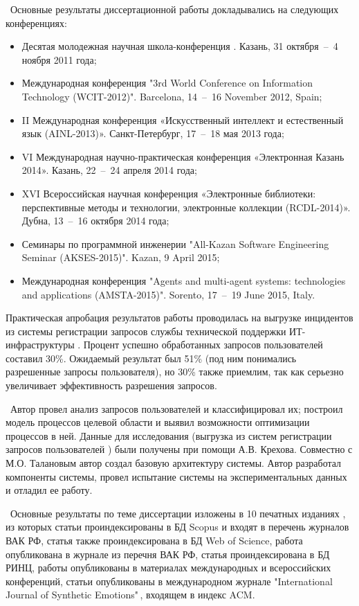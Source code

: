 \probation\
 Основные результаты диссертационной работы докладывались на следующих конференциях:
\begin{itemize}
	\item Десятая молодежная научная школа-конференция . Казань, 31 октября~--~4 ноября 2011 года;
	\item Международная конференция "3rd World Conference on Information Technology (WCIT-2012)". Barcelona, 14~--~16 November 2012, Spain; 
	\item II Международная конференция «Искусственный интеллект и естественный язык (AINL-2013)». Санкт-Петербург, 17~--~18 мая 2013 года;
	\item VI Международная научно-практическая конференция «Электронная Казань 2014». Казань, 22~--~24 апреля 2014 года;
	\item XVI Всероссийская научная конференция «Электронные библиотеки: перспективные методы и технологии, электронные коллекции (RCDL-2014)». Дубна, 13~--~16 октября 2014 года; 
	\item Семинары по программной инженерии "All-Kazan Software Engineering Seminar (AKSES-2015)". Kazan, 9 April 2015;
	\item Международная конференция "Agents and multi-agent systems: technologies and applications (AMSTA-2015)". Sorento, 17~--~19 June 2015, Italy.
\end{itemize} \par
Практическая апробация результатов работы проводилась на выгрузке инцидентов из системы регистрации запросов службы технической поддержки ИТ-инфраструктуры \icl. Процент успешно обработанных запросов пользователей составил 30\%. Ожидаемый результат был 51\% (под ним понимались разрешенные запросы пользователя), но 30\% также приемлим, так как серьезно увеличивает эффективность разрешения запросов. \par
\contribution\ Автор провел анализ запросов пользователей и классифицировал их; построил модель процессов целевой области и выявил возможности оптимизации процессов в ней. Данные для исследования (выгрузка из систем регистрации запросов пользователей \iclshort) были получены при помощи А.В. Крехова.  Совместно с М.О. Талановым автор создал базовую архитектуру системы. Автор разработал компоненты системы, провел испытание системы на экспериментальных данных и отладил ее работу. \par
\publications\ Основные результаты по теме диссертации изложены в 10 печатных изданиях  \cite{Lobachevskii, WCIT-2012,  ISGZ, IJSE-1, IJSE-2, RCDL-2014, AMSTA-2015, VAK-1, EB-1, EB-2}, из которых статьи \cite{RCDL-2014, AMSTA-2015} проиндексированы в БД Scopus и входят в перечень журналов ВАК РФ, статья \cite{AMSTA-2015} также проиндексирована в БД Web of Science, работа \cite{VAK-1} опубликована в журнале из перечня ВАК РФ, статья \cite{ISGZ} проиндексирована в БД РИНЦ, работы \cite{Lobachevskii, WCIT-2012, ISGZ} опубликованы в материалах международных и всероссийских конференций, статьи \cite{IJSE-1, IJSE-2} опубликованы в международном журнале "International Journal of Synthetic Emotions"\,, входящем в индекс ACM. \par
